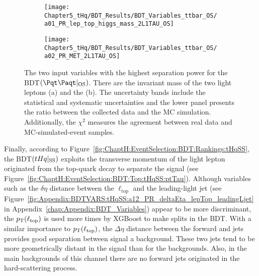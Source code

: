 \begin{figure}[h]
\centering
\begin{subfigure}{.475\textwidth}
  \centering
  \texttt{[image: Chapter5\_tHq/BDT\_Results/BDT\_Variables\_ttbar\_OS/a01\_PR\_lep\_top\_higgs\_mass\_2L1TAU\_OS]}
  \caption{}
  \label{fig:ChaptH:EventSelection:BDT:Top:ttbarOS:m_leps}
\end{subfigure}%
\begin{subfigure}{.475\textwidth}
  \centering
  \texttt{[image: Chapter5\_tHq/BDT\_Results/BDT\_Variables\_ttbar\_OS/a02\_PR\_MET\_2L1TAU\_OS]}
  \caption{}
  \label{fig:ChaptH:EventSelection:BDT:Top:ttbarOS:met}
\end{subfigure}
\caption{The two input variables with the highest separation power for the BDT$(\ttbar|_{\text{OS}})$. 
There are the invariant mass of the two light leptons (a) and the \MET (b).
The uncertainty bands include 
the statistical and systematic uncertainties and the lower panel presents the ratio between the collected data and the MC simulation.
Additionally, the $\chi^2$ measures the agreement between real data and MC-simulated-event samples.}
\label{fig:ChaptH:EventSelection:BDT:Top:ttbarOS}
\end{figure}


Finally, according to Figure~\ref{fig:ChaptH:EventSelection:BDT:Rankings:tHqSS}, 
the BDT$(tHq|_{\text{SS}})$ exploits the transverse momentum of the light lepton originated
from the top-quark decay to separate the signal (see Figure~\ref{fig:ChaptH:EventSelection:BDT:Top:tHqSS:ptTau}). 
Although variables such as the $\delta \eta$ distance
between the $\ell_{\text{top}}$ and the leading-light jet (see 
Figure~\ref{fig:Appendix:BDTVARS:tHqSS:a12_PR_deltaEta_lepTop_leadingLjet} in 
Appendix~\ref{chap:Appendix:BDT_Variables}) appear
to be more discriminant, the $p_{\text{T}}(\ell_{\text{top}})$ is used more times
by XGBoost to make splits in the BDT. With a similar importance to $p_{\text{T}}(\ell_{\text{top}})$,
the $\Delta \eta$ distance between the forward and \btagged jets provides good separation
between signal a background. %
These two jets tend to be more geometrically distant in the signal than for the backgrounds.
Also, in the main backgrounds of this channel there are no forward jets originated in the hard-scattering process.






